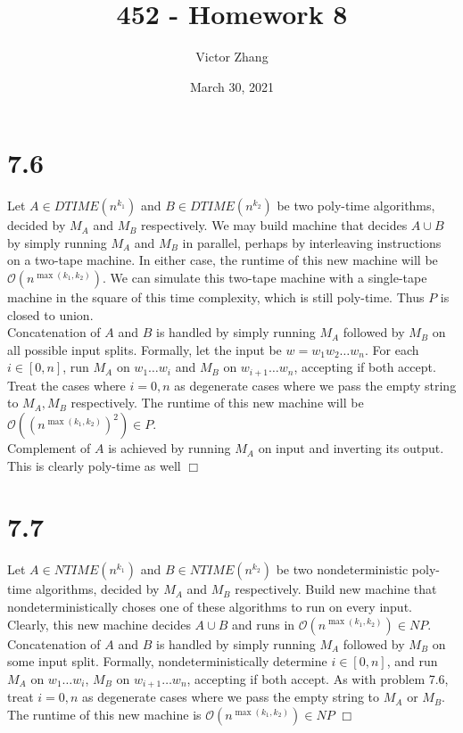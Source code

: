 \documentclass{article}
\title{452 - Homework 8}
\author{Victor Zhang}
\date{March 30, 2021}
\begin{document}
\maketitle

\section*{7.6}
Let $A \in DTIME(n^{k_1})$ and $B \in DTIME(n^{k_2})$ be two poly-time algorithms, decided by $M_A$ and $M_B$ respectively. We may build machine that decides $A \cup B$ by simply running $M_A$ and $M_B$ in parallel, perhaps by interleaving instructions on a two-tape machine. In either case, the runtime of this new machine will be $\mathcal{O}(n^{\max(k_1,k_2)})$. We can simulate this two-tape machine with a single-tape machine in the square of this time complexity, which is still poly-time. Thus $P$ is closed to union.\\
Concatenation of $A$ and $B$ is handled by simply running $M_A$ followed by $M_B$ on all possible input splits. Formally, let the input be $w = w_1w_2\dots w_n$. For each $i \in [0,n]$, run $M_A$ on $w_1\dots w_i$ and $M_B$ on $w_{i+1}\dots w_n$, accepting if both accept. Treat the cases where $i=0,n$ as degenerate cases where we pass the empty string to $M_A,M_B$ respectively. The runtime of this new machine will be $\mathcal{O}\left(\left(n^{\max(k_1,k_2)}\right)^2\right) \in P$.\\
Complement of $A$ is achieved by running $M_A$ on input and inverting its output. This is clearly poly-time as well $\Box$

\section*{7.7}
Let $A \in NTIME(n^{k_1})$ and $B \in NTIME(n^{k_2})$ be two nondeterministic poly-time algorithms, decided by $M_A$ and $M_B$ respectively. Build new machine that nondeterministically choses one of these algorithms to run on every input. Clearly, this new machine decides $A \cup B$ and runs in $\mathcal{O}(n^{\max(k_1,k_2)}) \in NP$.\\
Concatenation of $A$ and $B$ is handled by simply running $M_A$ followed by $M_B$ on some input split. Formally, nondeterministically determine $i \in [0,n]$, and run $M_A$ on $w_1\dots w_i$, $M_B$ on $w_{i+1}\dots w_n$, accepting if both accept. As with problem 7.6, treat $i=0,n$ as degenerate cases where we pass the empty string to $M_A$ or $M_B$. The runtime of this new machine is $\mathcal{O}(n^{\max(k_1,k_2)}) \in NP$ $\Box$
\end{document}
